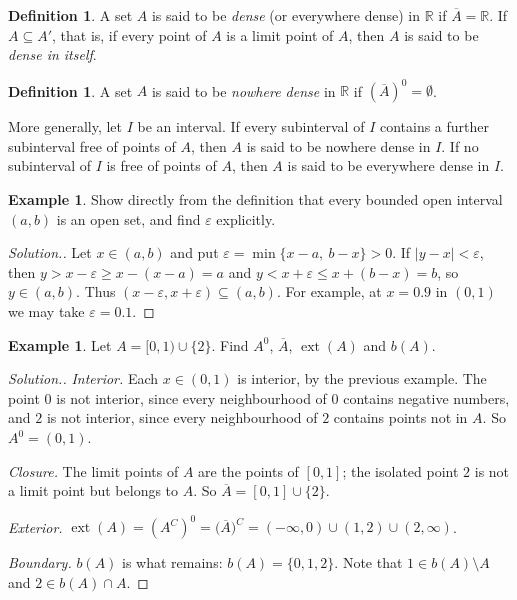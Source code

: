 \documentclass[11pt,a4paper]{article}
\numberwithin{equation}{section}
\theoremstyle{definition}
\newtheorem{defn}[thm]{Definition}
\newtheorem{exa}[thm]{Example}
\newenvironment{solution}
  {\renewcommand{\qedsymbol}{}\begin{proof}[\textit{Solution}.]}
  {\end{proof}}
\begin{document}
\begin{defn}
A set $A$ is said to be \emph{dense} (or everywhere dense) in $\mathbb{R}$ if $\overline{A} = \mathbb{R}$. If $A\subseteq A'$, that is, if every point of $A$ is a limit point of $A$, then $A$ is said to be \emph{dense in itself}.
\end{defn}


\begin{defn}
A set $A$ is said to be \emph{nowhere dense} in $\mathbb{R}$ if $(\overline{A})^0 = \emptyset$.

More generally, let $I$ be an interval. If every subinterval of $I$ contains a further subinterval free of points of $A$, then $A$ is said to be nowhere dense in $I$. If no subinterval of $I$ is free of points of $A$, then $A$ is said to be everywhere dense in $I$.
\end{defn}

\begin{exa}
Show directly from the definition that every bounded open interval $(a,b)$ is an open set, and find $\varepsilon$ explicitly.
\end{exa}

\begin{solution}
Let $x\in(a,b)$ and put $\varepsilon = \min\{x-a,\ b-x\}>0$. If $|y-x|<\varepsilon$, then $y>x-\varepsilon\geq x-(x-a) = a$ and $y<x+\varepsilon\leq x+(b-x) = b$, so $y\in(a,b)$. Thus $(x-\varepsilon,x+\varepsilon)\subseteq(a,b)$. For example, at $x = 0.9$ in $(0,1)$ we may take $\varepsilon = 0.1$.
\end{solution}

\begin{exa}
Let $A = [0,1)\cup\{2\}$. Find $A^0$, $\overline{A}$, $\operatorname{ext}(A)$ and $b(A)$.
\end{exa}

\begin{solution}
\emph{Interior.} Each $x\in(0,1)$ is interior, by the previous example. The point $0$ is not interior, since every neighbourhood of $0$ contains negative numbers, and $2$ is not interior, since every neighbourhood of $2$ contains points not in $A$. So $A^0 = (0,1)$.

\emph{Closure.} The limit points of $A$ are the points of $[0,1]$; the isolated point $2$ is not a limit point but belongs to $A$. So $\overline{A} = [0,1]\cup\{2\}$.

\emph{Exterior.} $\operatorname{ext}(A) = (A^C)^0 = \bigl(\overline{A}\bigr)^C = (-\infty,0)\cup(1,2)\cup(2,\infty)$.

\emph{Boundary.} $b(A)$ is what remains: $b(A) = \{0,1,2\}$. Note that $1\in b(A)\setminus A$ and $2\in b(A)\cap A$.
\end{solution}
\end{document}
